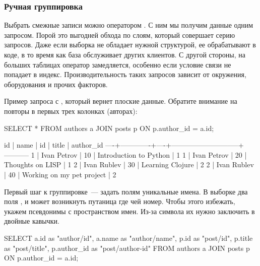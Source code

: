 \subsubsection{Ручная группировка}

Выбрать смежные записи можно оператором . С ним мы получим данные одним запросом. Порой это выгодней обхода по слоям, который совершает серию запросов. Даже если выборка не обладает нужной структурой, ее обрабатывают в коде, в то время как база обслуживает других клиентов. С другой стороны, на больших таблицах оператор  замедляется, особенно если условие связи не попадает в индекс. Производительность таких запросов зависит от окружения, оборудования и прочих факторов.

Пример запроса с , который вернет плоские данные. Обратите внимание на повторы в первых трех колонках (авторах):

\begin{english}
  \begin{sql}
SELECT *
FROM authors a
JOIN posts p ON p.author_id = a.id;
  \end{sql}
\end{english}

\begin{english}
  \begin{text}
 id |    name     | id |            title            | author_id
----+-------------+----+-----------------------------+-----------
  1 | Ivan Petrov | 10 | Introduction to Python      |         1
  1 | Ivan Petrov | 20 | Thoughts on LISP            |         1
  2 | Ivan Rublev | 30 | Learning Clojure            |         2
  2 | Ivan Rublev | 40 | Working on my pet project   |         2
  \end{text}
\end{english}

Первый шаг к группировке~--- задать полям уникальные имена. В выборке два поля , и может возникнуть путаница где чей номер. Чтобы этого избежать, укажем псевдонимы с пространством имен. Из-за символа \code{/} их нужно заключить в двойные кавычки.

\begin{english}
  \begin{sql}
SELECT
  a.id        as "author/id",
  a.name      as "author/name",
  p.id        as "post/id",
  p.title     as "post/title",
  p.author_id as "post/author-id"
FROM authors a
JOIN posts p ON p.author_id = a.id;
  \end{sql}
\end{english}

